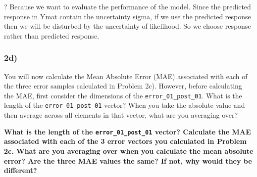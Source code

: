 \documentclass[
]{article}
\newenvironment{Shaded}{\begin{snugshade}}{\end{snugshade}}
\newcommand{\DecValTok}[1]{\textcolor[rgb]{0.00,0.00,0.81}{#1}}
\newcommand{\DocumentationTok}[1]{\textcolor[rgb]{0.56,0.35,0.01}{\textbf{\textit{#1}}}}
\newcommand{\NormalTok}[1]{#1}
\newcommand{\OtherTok}[1]{\textcolor[rgb]{0.56,0.35,0.01}{#1}}
\newcommand{\SpecialCharTok}[1]{\textcolor[rgb]{0.00,0.00,0.00}{#1}}
\begin{document}
\begin{Shaded}
\end{Shaded}

? Because we want to evaluate the performance of the model. Since the
predicted response in Ymat contain the uncertainty sigma, if we use the
predicted response then we will be disturbed by the uncertainty of
likelihood. So we choose response rather than predicted response.

\hypertarget{d-1}{%
\subsubsection{2d)}\label{d-1}}

You will now calculate the Mean Absolute Error (MAE) associated with
each of the three error samples calculated in Problem 2c). However,
before calculating the MAE, first consider the dimensions of the
\texttt{error\_01\_post\_01}. What is the length of the
\texttt{error\_01\_post\_01} vector? When you take the absolute value
and then average across all elements in that vector, what are you
averaging over?

\textbf{What is the length of the \texttt{error\_01\_post\_01} vector?
Calculate the MAE associated with each of the 3 error vectors you
calculated in Problem 2c. What are you averaging over when you calculate
the mean absolute error? Are the three MAE values the same? If not, why
would they be different?}
\end{document}
